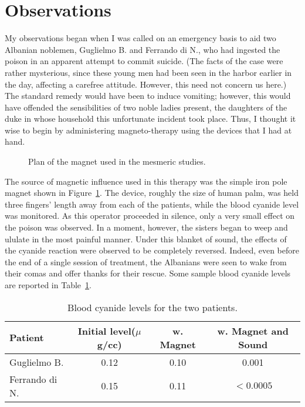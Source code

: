 \documentclass[12pt]{article}
\begin{document}
\section{Observations}

My observations began when I was called on an emergency basis to aid two
Albanian noblemen, Guglielmo B. and Ferrando di N., who had
ingested the poison in an apparent attempt to commit suicide.  (The facts
of the case were rather mysterious, since these young men had been seen in the 
harbor earlier in the day, affecting a carefree attitude.  However, this 
need not concern us here.)  The standard remedy would have been to induce
vomiting; however, this would have offended the 
sensibilities   of two 
noble ladies present, the daughters of the duke in whose household this 
unfortunate incident took place.  Thus, I thought it wise to begin by 
administering magneto-therapy using the devices that I had at hand.

\begin{figure}[htb]
\centering
\caption{Plan of the magnet used in the mesmeric studies.}
\label{fig:magnet}
\end{figure}

The source of magnetic influence used in this therapy was the simple
iron pole magnet shown in Figure~\ref{fig:magnet}.  The device, roughly
the size of human palm, was held three fingers' length away from each
of the patients, while the blood cyanide level was monitored.  As this 
operator proceeded in silence, only a very small effect on the poison was
observed.  In a moment, however, the sisters began to weep and ululate
in the most painful manner.  Under this blanket of sound, the effects of 
the cyanide reaction were observed to be completely reversed.  Indeed,
even before the end of a single session of treatment, the Albanians were
seen to wake from their comas and offer thanks for their rescue.  Some
sample blood cyanide levels are reported in Table~\ref{tab:blood}.



\begin{table}[t]
\begin{center}
\begin{tabular}{l|ccc}  
Patient &  Initial level($\mu$g/cc) &  w. Magnet &  
w. Magnet and Sound \\ \hline
 Guglielmo B.  &   0.12     &     0.10      &     0.001  \\
 Ferrando di N. &  0.15     &     0.11      &  $< 0.0005$ \\ \hline
\end{tabular}
\caption{Blood cyanide levels for the two patients.}
\label{tab:blood}
\end{center}
\end{table}
\end{document}
